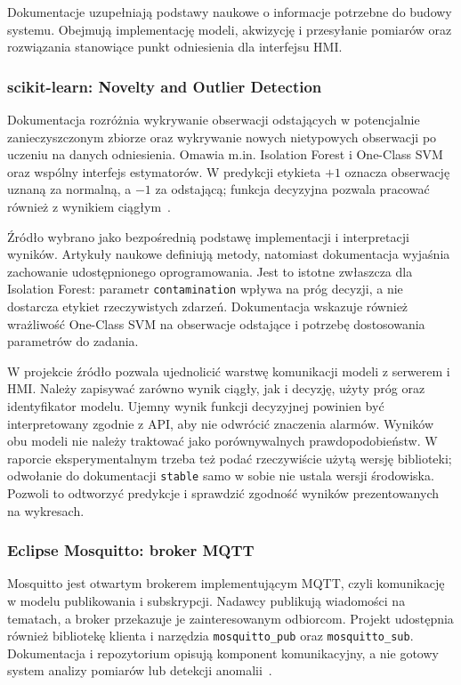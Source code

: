 \documentclass[12pt,a4paper]{article}
\begin{document}
Dokumentacje uzupełniają podstawy naukowe o informacje potrzebne do budowy
systemu. Obejmują implementację modeli, akwizycję i przesyłanie pomiarów
oraz rozwiązania stanowiące punkt odniesienia dla interfejsu HMI.

\subsubsection{scikit-learn: Novelty and Outlier Detection}
Dokumentacja rozróżnia wykrywanie obserwacji odstających w potencjalnie
zanieczyszczonym zbiorze oraz wykrywanie nowych nietypowych obserwacji
po uczeniu na danych odniesienia. Omawia m.in. Isolation Forest i One-Class
SVM oraz wspólny interfejs estymatorów. W predykcji etykieta $+1$ oznacza
obserwację uznaną za normalną, a $-1$ za odstającą; funkcja decyzyjna
pozwala pracować również z wynikiem ciągłym~\cite{sklearn_docs}.

Źródło wybrano jako bezpośrednią podstawę implementacji i interpretacji
wyników. Artykuły naukowe definiują metody, natomiast dokumentacja wyjaśnia
zachowanie udostępnionego oprogramowania. Jest to istotne zwłaszcza dla
Isolation Forest: parametr \texttt{contamination} wpływa na próg decyzji,
a nie dostarcza etykiet rzeczywistych zdarzeń. Dokumentacja wskazuje również
wrażliwość One-Class SVM na obserwacje odstające i potrzebę dostosowania
parametrów do zadania.

W projekcie źródło pozwala ujednolicić warstwę komunikacji modeli
z serwerem i HMI. Należy zapisywać zarówno wynik ciągły, jak i decyzję,
użyty próg oraz identyfikator modelu. Ujemny wynik funkcji decyzyjnej
powinien być interpretowany zgodnie z API, aby nie odwrócić znaczenia
alarmów. Wyników obu modeli nie należy traktować jako porównywalnych
prawdopodobieństw. W raporcie eksperymentalnym trzeba też podać rzeczywiście
użytą wersję biblioteki; odwołanie do dokumentacji \texttt{stable} samo
w sobie nie ustala wersji środowiska. Pozwoli to odtworzyć predykcje
i sprawdzić zgodność wyników prezentowanych na wykresach.

\subsubsection{Eclipse Mosquitto: broker MQTT}
Mosquitto jest otwartym brokerem implementującym MQTT, czyli komunikację
w modelu publikowania i subskrypcji. Nadawcy publikują wiadomości na
tematach, a broker przekazuje je zainteresowanym odbiorcom. Projekt
udostępnia również bibliotekę klienta i narzędzia \texttt{mosquitto\_pub}
oraz \texttt{mosquitto\_sub}. Dokumentacja i repozytorium opisują komponent
komunikacyjny, a nie gotowy system analizy pomiarów lub
detekcji anomalii~\cite{mosquitto_docs}.
\end{document}
